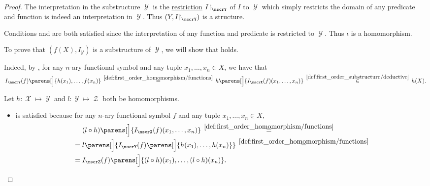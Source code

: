 \begin{proof}
   The interpretation in the substructure \( \mscrY \) is the \hyperref[def:multi_valued_function/restriction]{restriction} \( I\restr_\mscrY \) of \( I \) to \( \mscrY \) which simply restricts the domain of any predicate and function is indeed an interpretation in \( \mscrY \). Thus \( (Y, I\restr_\mscrY) \) is a structure.

  Conditions  and  are both satisfied since the interpretation of any function and predicate is restricted to \( \mscrY \). Thus \( \iota \) is a homomorphism.

   To prove that \( (f(X), I_\mscrY) \) is a substructure of \( \mscrY \), we will show that  holds.

  Indeed, by , for any \( n \)-ary functional symbol and any tuple \( {x_1, \ldots, x_n \in X} \), we have that
  \begin{equation*}
    I_\mscrY(f) \parens[\Big]{ h(x_1), \ldots, f(x_n) }
    \reloset {\ref{def:first_order_homomorphism/functions}} =
    h\parens[\Big]{ I_\mscrX(f)(x_1, \ldots, x_n) }
    \reloset {\ref{def:first_order_substructure/deductive}} \in
    h(X).
  \end{equation*}

   Let \( h: \mscrX \mapsto \mscrY \) and \( l: \mscrY \mapsto \mscrZ \) both be homomorphisms.

  \begin{itemize}
    \item {} is satisfied because for any \( n \)-ary functional symbol \( f \) and any tuple \( x_1, \ldots, x_n \in X \),
    \begin{align*}
      &\phantom{{}={}}
      (l \bincirc h) \parens[\Big]{ I_\mscrX(f)(x_1, \ldots, x_n) }
      \reloset {\ref{def:first_order_homomorphism/functions}} = \\ &=
      l\parens[\Big]{ I_\mscrY(f) \parens[\Big]{ h(x_1), \ldots, h(x_n) } }
      \reloset {\ref{def:first_order_homomorphism/functions}} = \\ &=
      I_{\mscrZ}(f) \parens[\Big]{ (l \bincirc h)(x_1), \ldots, (l \bincirc h)(x_n) }.
    \end{align*}


\end{itemize}
\end{proof}
